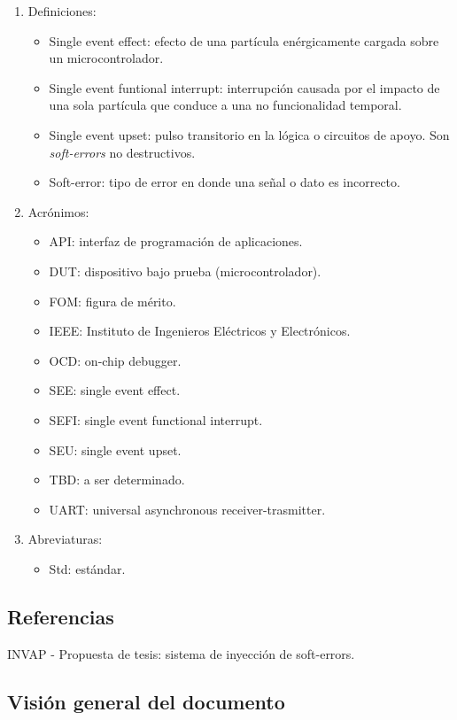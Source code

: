 \documentclass[
11pt, %
codirector, %
]{charter}
\begin{document}
\begin{enumerate}
	\item Definiciones:
		\begin{itemize}
			\item Single event effect: efecto de una partícula enérgicamente cargada sobre un microcontrolador.
			\item Single event funtional interrupt: interrupción causada por el impacto de una sola partícula que conduce a una no funcionalidad temporal.
			\item Single event upset: pulso transitorio en la lógica o circuitos de apoyo. Son \emph{soft-errors} no destructivos.
			\item Soft-error: tipo de error en donde una señal o dato es incorrecto.
		\end{itemize}
	\item Acrónimos:
		\begin{itemize}
			\item API: interfaz de programación de aplicaciones.
			\item DUT: dispositivo bajo prueba (microcontrolador).
			\item FOM: figura de mérito.
			\item IEEE: Instituto de Ingenieros Eléctricos y Electrónicos.
			\item OCD: on-chip debugger.
			\item SEE: single event effect.
			\item SEFI: single event functional interrupt.
			\item SEU: single event upset.
			\item TBD: a ser determinado.
			\item UART: universal asynchronous receiver-trasmitter.
		\end{itemize}
	\item Abreviaturas:
		\begin{itemize}
			\item Std: estándar.
		\end{itemize}
\end{enumerate}

\subsection{Referencias}
\label{sub:referencias}
INVAP - Propuesta de tesis: sistema de inyección de soft-errors.

\subsection{Visión general del documento}
\label{sub:vision}
\end{document}
